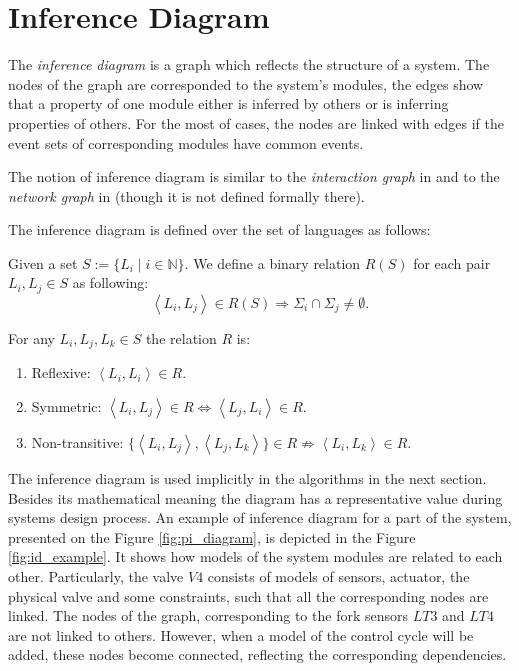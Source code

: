 \section{Inference Diagram}

The \emph{inference diagram} is a graph which reflects the structure of a
system.
The nodes of the graph are corresponded to the system's modules, the edges show that
a property of one module either is inferred by others or is inferring
properties of others. For the most of cases, the nodes are linked with edges if
the event sets of corresponding modules have common events.   

The notion of inference diagram is similar to the \emph{interaction graph} in
\cite{fabre_distributed_2005} and to the \emph{network graph} in
\cite{su_global_2005} (though it is not defined formally there).

The inference diagram is defined over the set of languages as
follows:
\begin{definition}
Given a set $S := \{L_i\mid i\in \mathbb{N}\}$. We define a binary relation
$R(S)$ for each pair $L_i, L_j \in S$ as following:
\begin{equation}
	\left<L_i, L_j \right> \in R(S) \Rightarrow 
	\Sigma_i \cap \Sigma_j \neq \emptyset.
\end{equation}
\end{definition}

For any $L_i, L_j, L_k \in S$ the relation
$R$ is:
\begin{enumerate}
  \item Reflexive: $\left<L_i, L_i \right> \in R$.
  \item Symmetric: $\left<L_i, L_j \right> \in R \Leftrightarrow 
  		\left<L_j,L_i \right> \in R$.
  \item Non-transitive: 
  		$\{\left<L_i, L_j \right>, \left<L_j, L_k \right>\} \in R
  		\not \Rightarrow \left<L_i, L_k \right> \in R$.  
\end{enumerate}

The inference diagram is used implicitly in the algorithms in the next section.
Besides its mathematical meaning the diagram has a representative value during
systems design process. An example of inference diagram for a part of the
system, presented on the Figure \ref{fig:pi_diagram}, is depicted in the Figure
\ref{fig:id_example}. It shows how models of the system modules are related to
each other. Particularly, the valve $V4$ consists of models of sensors,
actuator, the physical valve and some constraints, such that all the
corresponding nodes are linked. The nodes of the graph, corresponding to
the fork sensors $LT3$ and $LT4$ are not linked to others. However, when a model
of the control cycle will be added, these nodes become connected, reflecting
the corresponding dependencies.

